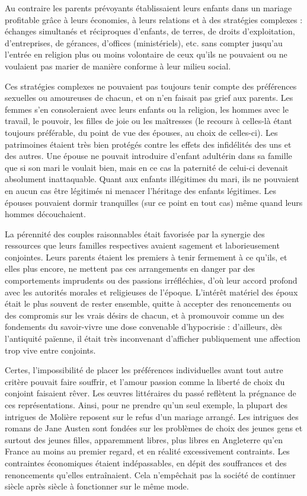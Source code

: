  Au contraire les parents prévoyants établissaient leurs enfants dans un mariage profitable grâce à leurs économies, à leurs relations et à des stratégies complexes : échanges simultanés et réciproques d'enfants, de terres, de droits d'exploitation, d'entreprises, de gérances, d'offices (ministériels), etc. sans compter jusqu'au  l'entrée en religion plus ou moins volontaire de ceux qu'ils ne pouvaient ou ne voulaient pas marier de manière conforme à leur milieu social. 

 Ces stratégies complexes ne pouvaient pas toujours tenir compte des préférences sexuelles ou amoureuses de chacun, et on n'en faisait pas grief aux parents. Les femmes s'en consoleraient avec leurs enfants ou la religion, les hommes avec le travail, le pouvoir, les filles de joie ou les maîtresses (le recours à celles-là étant toujours préférable, du point de vue des épouses, au choix de celles-ci). Les patrimoines étaient très bien protégés contre les effets des infidélités des uns et des autres. Une épouse ne pouvait introduire d'enfant adultérin dans sa famille que si son mari le voulait bien, mais en ce cas la paternité de celui-ci devenait absolument inattaquable. Quant aux enfants illégitimes du mari, ils ne pouvaient en aucun cas être légitimés ni menacer l'héritage des enfants légitimes. Les épouses pouvaient dormir tranquilles (sur ce point en tout cas) même quand leurs hommes découchaient. 

 La pérennité des couples raisonnables était favorisée par la synergie des ressources que leurs familles respectives avaient sagement et laborieusement conjointes. Leurs parents étaient les premiers à tenir fermement à ce qu'ils, et elles plus encore, ne mettent pas ces arrangements en danger par des comportements imprudents ou des passions irréfléchies, d'où leur accord profond avec les autorités morales et religieuses de l'époque. L'intérêt matériel des époux était le plus souvent de rester ensemble, quitte à accepter des renoncements ou des compromis sur les vrais désirs de chacun, et à promouvoir comme un des fondements du savoir-vivre une dose convenable d'hypocrisie : d'ailleurs, dès l'antiquité païenne, il était très inconvenant d'afficher publiquement une affection trop vive entre conjoints. 

 Certes, l'impossibilité de placer les préférences individuelles avant tout autre critère pouvait faire souffrir, et l'amour passion comme la liberté de choix du conjoint faisaient rêver. Les œuvres littéraires du passé reflètent la prégnance de ces représentations. Ainsi, pour ne prendre qu'un seul exemple, la plupart des intrigues de Molière reposent sur le refus d'un mariage arrangé. Les intrigues des romans de Jane Austen sont fondées sur les problèmes de choix des jeunes gens et surtout des jeunes filles, apparemment libres, plus libres en Angleterre qu'en France au moins au premier regard, et en réalité excessivement contraints. Les contraintes économiques étaient indépassables, en dépit des souffrances et des renoncements qu'elles entraînaient. Cela n'empêchait pas la société de continuer siècle après siècle à fonctionner sur le même mode. 

